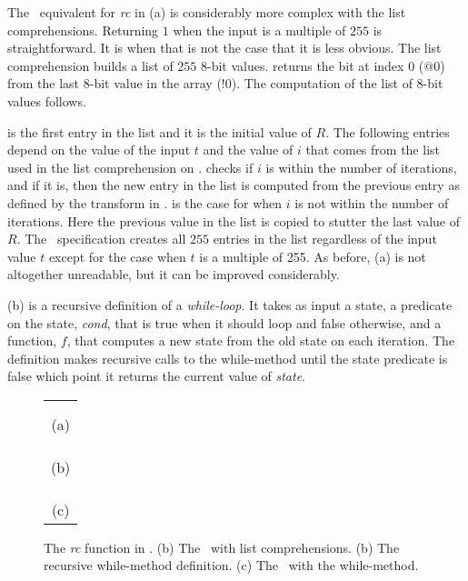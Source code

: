 The \cryptol\ equivalent for \emph{rc} in (a) is considerably more complex with the list comprehensions.
Returning $1$ when the input is a multiple of $255$ is straightforward.
It is when that is not the case that it is less obvious.
The list comprehension builds a list of $255$ 8-bit values.
 returns the bit at index 0 ($@0$) from the last 8-bit value in the array ($!0$).
The computation of the list of 8-bit values follows.

 is the first entry in the list and it is the initial value of $R$.
The following entries depend on the value of the input $t$ and the value of $i$ that comes from the list used in the list comprehension on .
 checks if $i$ is within the number of iterations, and if it is, then the new entry in the list is computed from the previous entry as defined by the transform in .
 is the case for when $i$ is not within the number of iterations.
Here the previous value in the list is copied to stutter the last value of $R$. 
The \cryptol\ specification creates all $255$ entries in the list regardless of the input value $t$ except for the case when $t$ is a multiple of 255.
As before, (a) is not altogether unreadable, but it can be improved considerably.

(b) is a recursive definition of a \emph{while-loop}.
It takes as input a state, a predicate on the state, \emph{cond}, that is true when it should loop and false otherwise, and a function, $f$, that computes a new state from the old state on each iteration.
The definition makes recursive calls to the while-method until the state predicate is false which point it returns the current value of \emph{state}.

\begin{figure}[h]
  \begin{center}
    \begin{tabular}{l}
      \usebox{\RcCry} \\ \\
      \multicolumn{1}{c}{(a)} \\ \\
      \usebox{\whilemethod} \\ \\
      \multicolumn{1}{c}{(b)} \\ \\ 
      \usebox{\RcCryLib} \\ \\
      \multicolumn{1}{c}{(c)}
    \end{tabular}
  \end{center}
  \caption{The \emph{rc} function in \cryptol. (b) The \cryptol\ with list comprehensions. (b) The recursive while-method definition. (c) The \cryptol\ with the while-method.}
  \label{fig:rccry}
\end{figure}

